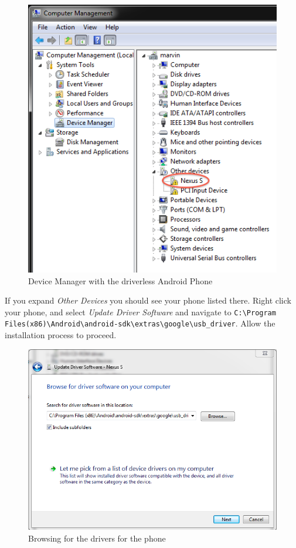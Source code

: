 \begin{figure}[!ht]
  \includegraphics[width=\textwidth]{./images/device_manager.png}%
  \caption{Device Manager with the driverless Android Phone}
  \label{fig:device_manager}
\end{figure}

If you expand \textit{Other Devices} you should see your phone listed there. Right click your phone, and select \textit{Update Driver Software} and navigate to \Verb|C:\Program Files(x86)\Android\android-sdk\extras\google\usb_driver|. Allow the installation process to proceed. 

\begin{figure}[!ht]
  \includegraphics[width=\textwidth]{./images/browse_drivers.png}%
  \caption{Browsing for the drivers for the phone}
  \label{fig:browse_driver}
\end{figure}

